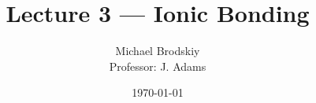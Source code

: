 


\title{Lecture 3 — Ionic Bonding}
\date{\today}
\author{Michael Brodskiy\\ \small Professor: J. Adams}



\maketitle

